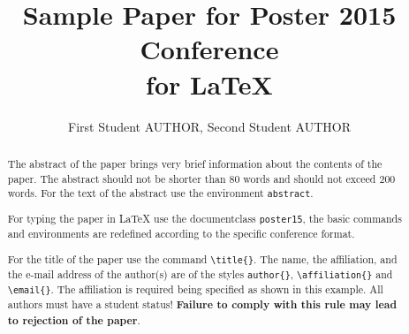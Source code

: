 \documentclass{poster15}
\begin{document}

%
\title{Sample Paper for Poster 2015 Conference \\ for \LaTeX}
%

%
\author{First Student AUTHOR, Second Student AUTHOR}
%


\maketitle


\begin{abstract}
The abstract of the paper brings very brief information about the contents of the paper. The abstract should not be shorter than 80 words and should not exceed 200 words. For the text of the abstract use the environment \verb+abstract+.

For typing the paper in \LaTeX{} use the documentclass \verb+poster15+, the basic commands and environments are redefined according to the specific conference format.

For the title of the paper use the command \verb+\title{}+. The name, the affiliation, and the e-mail address of the author(s) are of the styles \verb+author{}+, \verb+\affiliation{}+ and \verb+\email{}+. The affiliation is required being specified as shown in this example. All authors must have a student status! \textbf{Failure to comply with this rule may lead to rejection of the paper}.
\end{abstract}
\end{document}
